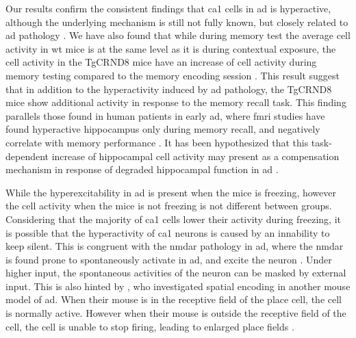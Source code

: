 Our results confirm the consistent findings that \gls{ca1} cells in \gls{ad} is hyperactive, although the underlying mechanism is still not fully known, but closely related to \gls{ad} pathology . We have also found that while during memory test the average cell activity in \gls{wt} mice is at the same level as it is during contextual exposure, the cell activity in the TgCRND8 mice have an increase of cell activity during memory testing compared to the memory encoding session . This result suggest that in addition to the hyperactivity induced by \gls{ad} pathology, the TgCRND8 mice show additional activity in response to the memory recall task. This finding parallels those found in human patients in early \gls{ad}, where \gls{fmri} studies have found hyperactive hippocampus only during memory recall, and negatively correlate with memory performance \citep{sperling09, reiman12, kunz15}. It has been hypothesized that this task-dependent increase of hippocampal cell activity may present as a compensation mechanism in response of degraded hippocampal function in \gls{ad} \citep{kunz15}.

While the hyperexcitability in \gls{ad} is present when the mice is freezing, however the cell activity when the mice is not freezing is not different between groups. Considering that the majority of \gls{ca1} cells lower their activity during freezing, it is possible that the hyperactivity of \gls{ca1} neurons is caused by an innability to keep silent. This is congruent with the \gls{nmdar} pathology in \gls{ad}, where the \gls{nmdar} is found prone to spontaneously activate in \gls{ad}, and excite the neuron . Under higher input, the spontaneous activities of the neuron can be masked by external input. This is also hinted by \citet{cheng13}, who investigated spatial encoding in another mouse model of \gls{ad}. When their mouse is in the receptive field of the place cell, the cell is normally active. However when their mouse is outside the receptive field of the cell, the cell is unable to stop firing, leading to enlarged place fields \citep{cheng13}. 

